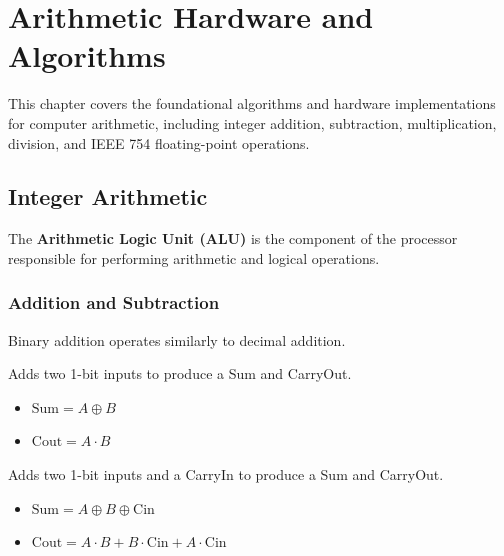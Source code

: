 \chapter{Arithmetic Hardware and Algorithms}

This chapter covers the foundational algorithms and hardware implementations for computer arithmetic, including integer addition, subtraction, multiplication, division, and IEEE 754 floating-point operations.

\section{Integer Arithmetic}

\begin{vocabulary}[ALU]
The \textbf{Arithmetic Logic Unit (ALU)} is the component of the processor responsible for performing arithmetic and logical operations.
\end{vocabulary}

\subsection{Addition and Subtraction}

Binary addition operates similarly to decimal addition. 

\begin{definition}
Adds two 1-bit inputs to produce a Sum and CarryOut.

\begin{itemize}
    \item $\text{Sum} = A \oplus B$
    \item $\text{Cout} = A \cdot B$
\end{itemize}

\end{definition}

\medskip

\begin{definition}
Adds two 1-bit inputs and a CarryIn to produce a Sum and CarryOut.

\begin{itemize}
    \item $\text{Sum} = A \oplus B \oplus \text{Cin}$
    \item $\text{Cout} = A \cdot B + B \cdot \text{Cin} + A \cdot \text{Cin}$
\end{itemize}

\end{definition}

